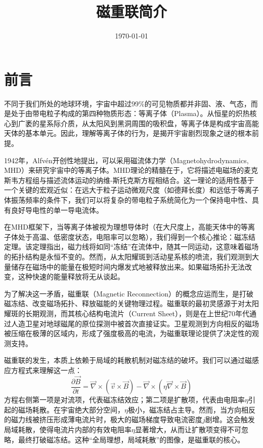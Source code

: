 \documentclass[lang=cn,color=blue,cm,11pt,scheme=chinese,bibend=bibtex,sorting=nty]{elegantbook}
\title{磁重联简介}
\author{}%
\institute{}
\date{\today}
\begin{document}
	
	\maketitle
	\frontmatter
	\chapter*{前言}
	不同于我们所处的地球环境，宇宙中超过99\%的可见物质都并非固、液、气态，而是处于由带电粒子构成的第四种物质形态：等离子体（Plasma）。从恒星的炽热核心到广袤的星系际介质，从太阳风到黑洞周围的吸积盘，等离子体是构成宇宙高能天体的基本单元。因此，理解等离子体的行为，是揭开宇宙剧烈现象之谜的根本前提。
	
	1942年，Alfvén开创性地提出，可以采用磁流体力学（Magnetohydrodynamics, MHD）来研究宇宙中的等离子体。MHD理论的精髓在于，它将描述电磁场的麦克斯韦方程组与描述流体运动的纳维-斯托克斯方程相结合。这一理论的适用性基于一个关键的宏观近似：在远大于粒子运动微观尺度（如德拜长度）和远低于等离子体振荡频率的条件下，我们可以将复杂的带电粒子系统简化为一个保持电中性、具有良好导电性的单一导电流体。
	
	在MHD框架下，当等离子体被视为理想导体时（在大尺度上，高能天体中的等离子体处于高温、低密度状态，电阻率可以忽略），我们得到一个核心推论：磁冻结定理。该定理指出，磁力线将如同“冻结”在流体中，随其一同运动，这意味着磁场的拓扑结构是永恒不变的。然而，从太阳耀斑到活动星系核的喷流，我们观测到大量储存在磁场中的能量在极短时间内爆发式地被释放出来。如果磁场拓扑无法改变，这种快速的能量释放将无从谈起。
	
	为了解决这一矛盾，磁重联（Magnetic Reconnection）的概念应运而生，是打破磁冻结、改变磁场拓扑、释放磁能的关键物理过程。磁重联的最初灵感源于对太阳耀斑的长期观测，而其核心结构电流片（Current Sheet），则是在上世纪70年代通过人造卫星对地球磁尾的原位探测中被首次直接证实。卫星观测到方向相反的磁场被压缩在极薄的区域内，形成了强度极高的电流，为磁重联理论提供了决定性的观测支持。
	
	磁重联的发生，本质上依赖于局域的耗散机制对磁冻结的破坏。我们可以通过磁感应方程式来理解这一点：
	\begin{equation}
		\frac{\partial \vec{B}}{\partial t} = \vec{\nabla} \times (\vec{v} \times
		\vec{B}) - \vec{\nabla} \times (\eta \vec{\nabla} \times \vec{B})
	\end{equation}
	方程右侧第一项是对流项，代表磁冻结效应；第二项是扩散项，代表由电阻率$\eta$引起的磁场耗散。在宇宙绝大部分空间，$\eta$极小，磁冻结占主导。然而，当方向相反的磁力线被挤压形成薄电流片时，极大的磁场梯度导致电流密度$j$剧增。这会触发局域耗散，使得电流片内部的有效电阻率$\eta$显著增大，从而让扩散项变得不可忽略，最终打破磁冻结。这种“全局理想，局域耗散”的图像，是磁重联的核心。
	
\end{document}

